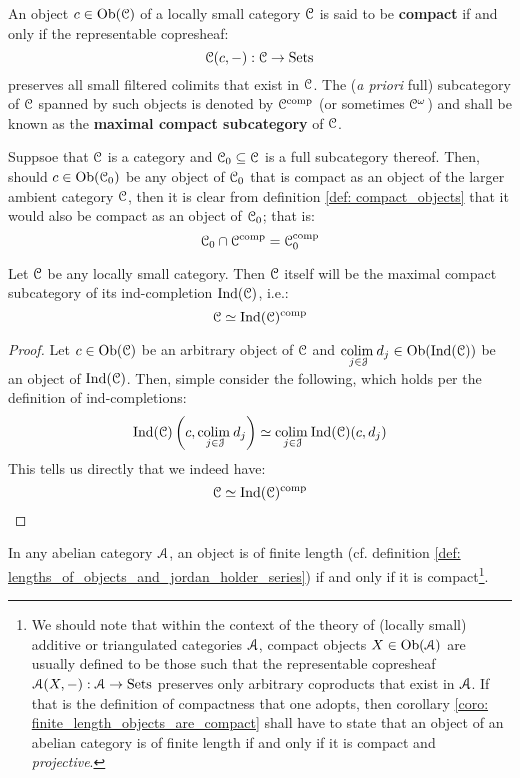             \begin{definition} \label{def: compact_objects}
                An object $c \in \mathrm{Ob}(\mathcal{C})$ of a locally small category $\mathcal{C}$ is said to be \textbf{compact} if and only if the representable copresheaf:
                    $$\mathcal{C}(c, -): \mathcal{C} \to \mathrm{Sets}$$
                preserves all small filtered colimits that exist in $\mathcal{C}$. The (\textit{a priori} full) subcategory of $\mathcal{C}$ spanned by such objects is denoted by $\mathcal{C}^{\mathrm{comp}}$ (or sometimes $\mathcal{C}^{\omega}$) and shall be known as the \textbf{maximal compact subcategory} of $\mathcal{C}$. 
            \end{definition}
            \begin{remark} \label{remark: compact_objects_in_full_subcategories}
                Suppsoe that $\mathcal{C}$ is a category and $\mathcal{C}_0 \subseteq \mathcal{C}$ is a full subcategory thereof. Then, should $c \in \mathrm{Ob}(\mathcal{C}_0)$ be any object of $\mathcal{C}_0$ that is compact as an object of the larger ambient category $\mathcal{C}$, then it is clear from definition \ref{def: compact_objects} that it would also be compact as an object of $\mathcal{C}_0$; that is:
                    $$\mathcal{C}_0 \cap \mathcal{C}^{\mathrm{comp}} = \mathcal{C}_0^{\mathrm{comp}}$$
            \end{remark}
            \begin{proposition} \label{prop: compact_objects_in_ind_completions}
                Let $\mathcal{C}$ be any locally small category. Then $\mathcal{C}$ itself will be the maximal compact subcategory of its ind-completion $\mathrm{Ind}(\mathcal{C})$, i.e.:
                    $$\mathcal{C} \simeq \mathrm{Ind}(\mathcal{C})^{\mathrm{comp}}$$
            \end{proposition}
                \begin{proof}
                    Let $c \in \mathrm{Ob}(\mathcal{C})$ be an arbitrary object of $\mathcal{C}$ and $\underset{j \in \mathcal{J}}{\operatorname{colim} \:} d_j \in \mathrm{Ob}(\mathrm{Ind}(\mathcal{C}))$ be an object of $\mathrm{Ind}(\mathcal{C})$. Then, simple consider the following, which holds per the definition of ind-completions:
                        $$\mathrm{Ind}(\mathcal{C})\left(c, \underset{j \in \mathcal{J}}{\operatorname{colim} \:} d_j\right) \simeq \underset{j \in \mathcal{J}}{\operatorname{colim} \:} \mathrm{Ind}(\mathcal{C})(c, d_j)$$
                    This tells us directly that we indeed have:
                        $$\mathcal{C} \simeq \mathrm{Ind}(\mathcal{C})^{\mathrm{comp}}$$
                \end{proof}
            \begin{corollary} \label{coro: finite_length_objects_are_compact}
                In any abelian category $\mathcal{A}$, an object is of finite length (cf. definition \ref{def: lengths_of_objects_and_jordan_holder_series}) if and only if it is compact\footnote{We should note that within the context of the theory of (locally small) additive or triangulated categories $\mathcal{A}$, compact objects $X \in \mathrm{Ob}(\mathcal{A})$ are usually defined to be those such that the representable copresheaf $\mathcal{A}(X, -): \mathcal{A} \to \mathrm{Sets}$ preserves only arbitrary coproducts that exist in $\mathcal{A}$. If that is the definition of compactness that one adopts, then corollary \ref{coro: finite_length_objects_are_compact} shall have to state that an object of an abelian category is of finite length if and only if it is compact and \textit{projective}.}. 
            \end{corollary}
